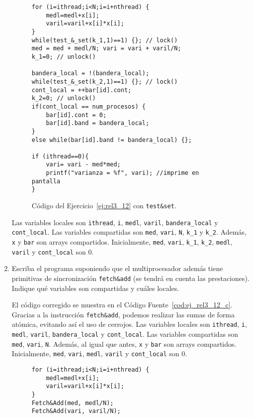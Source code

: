 \begin{ejercicio}
\begin{enumerate}
        \begin{figure}
            \centering
            \begin{verbatim}
for (i=ithread;i<N;i=i+nthread) {
    medl=medl+x[i];
    varil=varil+x[i]*x[i];
}
while(test_&_set(k_1,1)==1) {}; // lock()
med = med + medl/N; vari = vari + varil/N;
k_1=0; // unlock()

bandera_local = !(bandera_local);
while(test_&_set(k_2,1)==1) {}; // lock()
cont_local = ++bar[id].cont;
k_2=0; // unlock()
if(cont_local == num_procesos) {
    bar[id].cont = 0;
    bar[id].band = bandera_local;
}
else while(bar[id].band != bandera_local) {};

if (ithread==0){
    vari= vari - med*med;
    printf("varianza = %f", vari); //imprime en pantalla
} 
            \end{verbatim}
            \caption{Código del Ejercicio~\ref{ej:rel3_12} con \texttt{test\&set}.}
            \label{cod:ej_rel3_12_b}
        \end{figure}

        Las variables locales son \verb|ithread|, \verb|i|, \verb|medl|, \verb|varil|, \verb|bandera_local| y \verb|cont_local|.
        Las variables compartidas son \verb|med|, \verb|vari|, \verb|N|, \verb|k_1| y \verb|k_2|. Además,
        \verb|x| y \verb|bar| son arrays compartidos. Inicialmente,
        \verb|med|, \verb|vari|, \verb|k_1|, \verb|k_2|, \verb|medl|, \verb|varil| y \verb|cont_local| son 0.

        \item Escriba el programa suponiendo que el multiprocesador además tiene primitivas de sincronización
        \verb|fetch&add| (se tendrá en cuenta las prestaciones). Indique qué variables son compartidas y
        cuáles locales.

        El código corregido se muestra en el Código Fuente~\ref{cod:ej_rel3_12_c}. Gracias a la instrucción \verb|fetch&add|, podemos realizar las sumas de forma atómica, evitando así el uso de cerrojos.
        Las variables locales son \verb|ithread|, \verb|i|, \verb|medl|, \verb|varil|, \verb|bandera_local| y \verb|cont_local|.
        Las variables compartidas son \verb|med|, \verb|vari|, \verb|N|. Además, al igual que antes,
        \verb|x| y \verb|bar| son arrays compartidos. Inicialmente,
        \verb|med|, \verb|vari|, \verb|medl|, \verb|varil| y \verb|cont_local| son 0.
        \begin{figure}
            \centering
            \begin{verbatim}
for (i=ithread;i<N;i=i+nthread) {
    medl=medl+x[i];
    varil=varil+x[i]*x[i];
}
Fetch&Add(med, medl/N);
Fetch&Add(vari, varil/N);


\end{verbatim}
\end{figure}
\end{enumerate}
\end{ejercicio}
